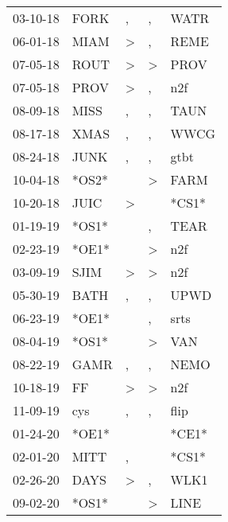 \begin{supertabular}{lllll}
 03-10-18 &   FORK &                , &                , &   WATR \\
 06-01-18 &   MIAM &     \textgreater &                , &   REME \\
 07-05-18 &   ROUT &     \textgreater &     \textgreater &   PROV \\
 07-05-18 &   PROV &     \textgreater &                , &    n2f \\
 08-09-18 &   MISS &                , &                , &   TAUN \\
 08-17-18 &   XMAS &                , &                , &   WWCG \\
 08-24-18 &   JUNK &                , &                , &   gtbt \\
 10-04-18 &  *OS2* &                  &     \textgreater &   FARM \\
 10-20-18 &   JUIC &     \textgreater &                  &  *CS1* \\
 01-19-19 &  *OS1* &                  &                , &   TEAR \\
 02-23-19 &  *OE1* &                  &     \textgreater &    n2f \\
 03-09-19 &   SJIM &     \textgreater &     \textgreater &    n2f \\
 05-30-19 &   BATH &                , &                , &   UPWD \\
 06-23-19 &  *OE1* &                  &                , &   srts \\
 08-04-19 &  *OS1* &                  &     \textgreater &    VAN \\
 08-22-19 &   GAMR &                , &                , &   NEMO \\
 10-18-19 &     FF &     \textgreater &     \textgreater &    n2f \\
 11-09-19 &    cys &                , &                , &   flip \\
 01-24-20 &  *OE1* &                  &                  &  *CE1* \\
 02-01-20 &   MITT &                , &                  &  *CS1* \\
 02-26-20 &   DAYS &     \textgreater &                , &   WLK1 \\
 09-02-20 &  *OS1* &                  &     \textgreater &   LINE \\
\end{supertabular}

